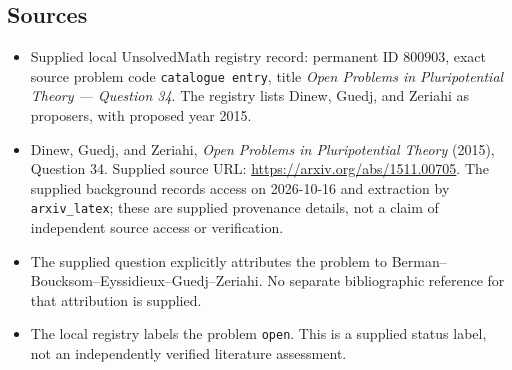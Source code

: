 \documentclass[11pt]{article}
\begin{document}
\subsection{Sources}
\begin{itemize}
\item Supplied local UnsolvedMath registry record: permanent ID \(800903\), exact source problem code \texttt{catalogue entry}, title \emph{Open Problems in Pluripotential Theory --- Question 34}. The registry lists Dinew, Guedj, and Zeriahi as proposers, with proposed year 2015.
\item Dinew, Guedj, and Zeriahi, \emph{Open Problems in Pluripotential Theory} (2015), Question 34. Supplied source URL: \url{https://arxiv.org/abs/1511.00705}. The supplied background records access on 2026-10-16 and extraction by \texttt{arxiv\_latex}; these are supplied provenance details, not a claim of independent source access or verification.
\item The supplied question explicitly attributes the problem to Berman--Boucksom--Eyssidieux--Guedj--Zeriahi. No separate bibliographic reference for that attribution is supplied.
\item The local registry labels the problem \texttt{open}. This is a supplied status label, not an independently verified literature assessment.
\end{itemize}
\end{document}
